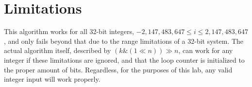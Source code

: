 \documentclass{article}
\newcommand*\BitAnd{\mathbin{\&}}
\newcommand*\ShiftLeft{\ll}
\newcommand*\ShiftRight{\gg}
\begin{document}
\section{Limitations}
This algorithm works for all 32-bit integers, $-2,147,483,647 \leq i \leq 2,147,483,647$, and only fails beyond that due to the range limitations of a 32-bit system. The actual algorithm itself, described by $(k \BitAnd (1 \ShiftLeft n)) \ShiftRight n$, can work for any integer if these limitations are ignored, and that the loop counter is initialized to the proper amount of bits. Regardless, for the purposes of this lab, any valid integer input will work properly.
\end{document}
